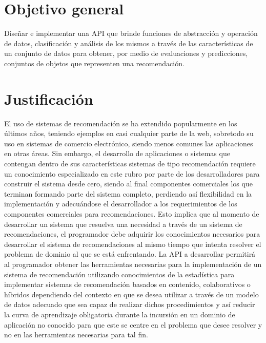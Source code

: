   \section {Objetivo general}
    Diseñar e implementar una API que brinde funciones de abstracción y operación de datos, clasificación y análisis de los mismos a través de las características de un conjunto de datos para obtener, por medio de evaluaciones y predicciones, conjuntos de objetos que representen una recomendación.

  \section{Justificación}
    El uso de sistemas de recomendación se ha extendido popularmente en los últimos años, teniendo ejemplos en casi cualquier parte de la web, sobretodo su uso en sistemas de comercio electrónico, siendo menos comunes las aplicaciones en otras áreas. Sin embargo, el desarrollo de aplicaciones o sistemas que contengan dentro de sus características sistemas de tipo recomendación requiere un conocimiento especializado en este rubro por parte de los desarrolladores para construir el sistema desde cero, siendo al final componentes comerciales los que terminan formando parte del sistema completo, perdiendo así flexibilidad en la implementación y adecuándose el desarrollador a los requerimientos de los componentes comerciales para recomendaciones. Esto implica que al momento de desarrollar un sistema que resuelva una necesidad a través de un sistema de recomendaciones, el programador debe adquirir los conocimientos necesarios para desarrollar el sistema de recomendaciones al mismo tiempo que intenta resolver el problema de dominio al que se está enfrentando. La API a desarrollar permitirá al programador obtener las herramientas necesarias para la implementación de un sistema de recomendación utilizando conocimientos de la estadística para implementar sistemas de recomendación basados en contenido, colaborativos o híbridos dependiendo del contexto en que se desea utilizar a través de un modelo de datos adecuado que sea capaz de realizar dichos procedimientos y así reducir la curva de aprendizaje obligatoria durante la incursión en un dominio de aplicación no conocido para que este se centre en el problema que desee resolver y no en las herramientas necesarias para tal fin.

